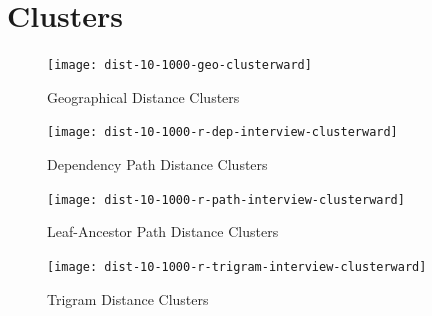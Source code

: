 \section{Clusters}
\begin{figure}
  \texttt{[image: dist-10-1000-geo-clusterward]} %
  \label{geo-dist-cluster}
  \caption{Geographical Distance Clusters}
\end{figure}
\begin{figure}
  \texttt{[image: dist-10-1000-r-dep-interview-clusterward]} %
  \label{dep-dist-cluster}
  \caption{Dependency Path Distance Clusters}
\end{figure}
\begin{figure}
  \texttt{[image: dist-10-1000-r-path-interview-clusterward]} %
  \label{path-dist-cluster}
  \caption{Leaf-Ancestor Path Distance Clusters}
\end{figure}
\begin{figure}
  \texttt{[image: dist-10-1000-r-trigram-interview-clusterward]} %
  \label{trigram-dist-cluster}
  \caption{Trigram Distance Clusters}
\end{figure}
